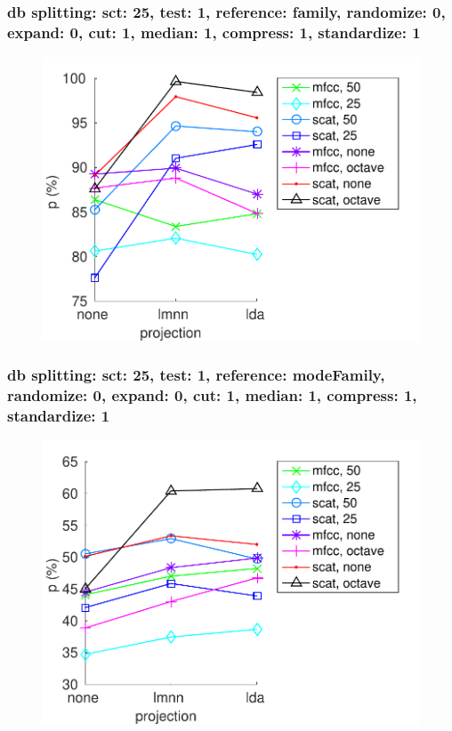 \documentclass{beamer}
\begin{document}
\begin{frame}\frametitle{\small db splitting: sct: 25, test: 1, reference: family, randomize: 0, expand: 0, cut: 1, median: 1, compress: 1, standardize: 1}
\begin{center}
\begin{figure}
\centering
\includegraphics[width=\textwidth,height=0.8\textheight,keepaspectratio]{./figures/Fig141.pdf}
\label{sc25Te1RefaRa0Ex0Cu1Me1Co1St1}
\end{figure}
\end{center}


\end{frame}

\begin{frame}\frametitle{\small db splitting: sct: 25, test: 1, reference: modeFamily, randomize: 0, expand: 0, cut: 1, median: 1, compress: 1, standardize: 1}
\begin{center}
\begin{figure}
\centering
\includegraphics[width=\textwidth,height=0.8\textheight,keepaspectratio]{./figures/Fig142.pdf}
\label{sc25Te1RemofaRa0Ex0Cu1Me1Co1St1}
\end{figure}
\end{center}


\end{frame}
\end{document}
